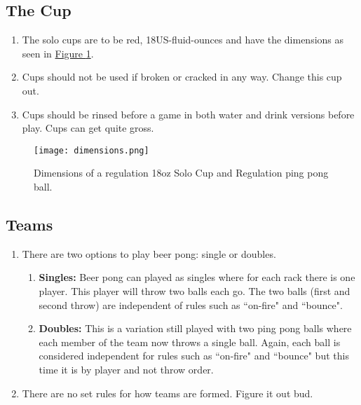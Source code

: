 	\subsection{The Cup}\label{ssec:Cup}
        \begin{enumerate}[label=(\roman*), ref=\roman*]
            \item \label{sssec:Cup,dim} The solo cups are to be red, 18US-fluid-ounces and have the dimensions as seen in \hyperref[fig:solocup]{Figure \ref*{fig:solocup}}. 
            \item \label{sssec:Cup,broken} Cups should not be used if broken or cracked in any way. Change this cup out. 
            \item \label{ssec:Cup,rinsing} Cups should be rinsed before a game in both water and drink versions before play. Cups can get quite gross. 
        \end{enumerate}
        \begin{figure}[H]
            \centering
            \texttt{[image: dimensions.png]}
            \caption{Dimensions of a regulation 18oz Solo Cup and Regulation ping pong ball.}
            \label{fig:solocup}
        \end{figure}
	\subsection{Teams}\label{ssec:Teams}
		\begin{enumerate}[label=(\roman*), ref=\roman*]
            \item \label{sssec:teams,options} There are two options to play beer pong: single or doubles. 
                \begin{enumerate}[label=(\alph*), leftmargin=2cm]%
                    \item \textbf{Singles:} Beer pong can played as singles where for each rack there is one player.
                        This player will throw two balls each go. 
                        The two balls (first and second throw) are independent of rules such as ``on-fire" and ``bounce".
                    \item \textbf{Doubles:}	This is a variation still played with two ping pong balls where each member of the team now throws a single ball.
                        Again, each ball is considered independent for rules such as ``on-fire" and ``bounce" but this time it is by player and not throw order.
                \end{enumerate} 
            \item \label{sssec:teams,choosing} There are no set rules for how teams are formed. Figure it out bud. 
        \end{enumerate}
